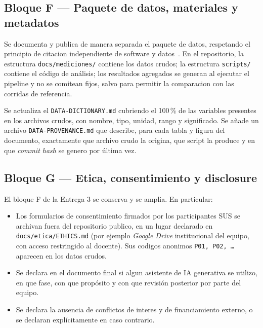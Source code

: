 \documentclass[11pt,a4paper]{article}
\begin{document}
\subsection{Bloque F --- Paquete de datos, materiales y metadatos}

Se documenta y publica de manera separada el paquete de datos, respetando el principio de citacion independiente de software y datos~\cite{smith2016software}. En el repositorio, la estructura \texttt{docs/mediciones/} contiene los datos crudos; la estructura \texttt{scripts/} contiene el c\'{o}digo de an\'{a}lisis; los resultados agregados se generan al ejecutar el pipeline y no se comitean fijos, salvo para permitir la comparacion con las corridas de referencia.

Se actualiza el \texttt{DATA-DICTIONARY.md} cubriendo el 100\,\% de las variables presentes en los archivos crudos, con nombre, tipo, unidad, rango y significado. Se a\~{n}ade un archivo \texttt{DATA-PROVENANCE.md} que describe, para cada tabla y figura del documento, exactamente que archivo crudo la origina, que script la produce y en que \emph{commit hash} se genero por \'{u}ltima vez.

\subsection{Bloque G --- Etica, consentimiento y disclosure}

El bloque F de la Entrega 3 se conserva y se amplia. En particular:

\begin{itemize}
    \item Los formularios de consentimiento firmados por los participantes SUS se archivan fuera del repositorio publico, en un lugar declarado en \texttt{docs/etica/ETHICS.md} (por ejemplo \emph{Google Drive} institucional del equipo, con acceso restringido al docente). Sus codigos anonimos \texttt{P01, P02, \ldots} aparecen en los datos crudos.
    \item Se declara en el documento final si algun asistente de IA generativa se utilizo, en que fase, con que prop\'{o}sito y con que revisi\'{o}n posterior por parte del equipo.
    \item Se declara la ausencia de conflictos de interes y de financiamiento externo, o se declaran expl\'{i}citamente en caso contrario.
\end{itemize}

\end{document}
